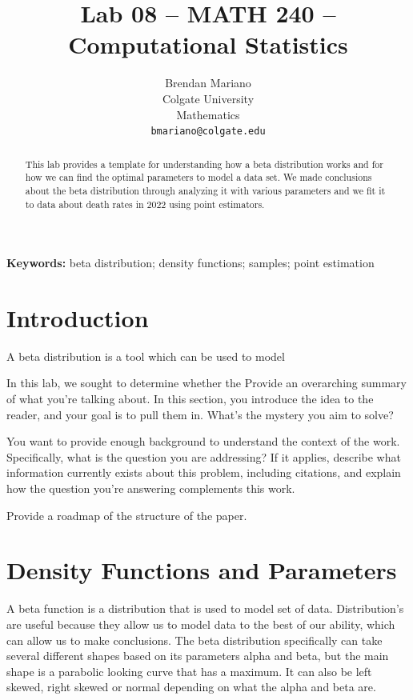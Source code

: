 \documentclass{article}\usepackage[]{graphicx}\usepackage[]{xcolor}
\begin{document}
\vspace{-1in}
\title{Lab 08 -- MATH 240 -- Computational Statistics}

\author{
  Brendan Mariano \\
  Colgate University  \\
  Mathematics  \\
  {\tt bmariano@colgate.edu}
}

\date{}

\maketitle

\begin{multicols}{2}
\begin{abstract}
This lab provides a template for understanding how a beta distribution works and for how we can find the optimal parameters to model a data set. We made conclusions about the beta distribution through analyzing it with various parameters and we fit it to data about death rates in 2022 using point estimators.

\end{abstract}

\noindent \textbf{Keywords:} beta distribution; density functions; samples; point estimation

\section{Introduction}
A beta distribution is a tool which can be used to model 


In this lab, we sought to determine whether the 
Provide an overarching summary of what you're talking about. In this section, you introduce the idea to the reader, and your goal is to pull them in. What's the mystery you aim to solve?

You want to provide enough background to understand the context of the work. Specifically, what is the question you are addressing? If it applies, describe what information currently exists about this problem, including citations, and explain how the question you're answering complements this work.

Provide a roadmap of the structure of the paper. 


\section{Density Functions and Parameters}
  A beta function is a distribution that is used to model set of data. Distribution's are useful because they allow us to model data to the best of our ability, which can allow us to make conclusions. The beta distribution specifically can take several different shapes based on its parameters alpha and beta,  but the main shape is a parabolic looking curve that has a maximum. It can also be left skewed, right skewed or normal depending on what the alpha and beta are. 


\end{multicols}
\end{document}
